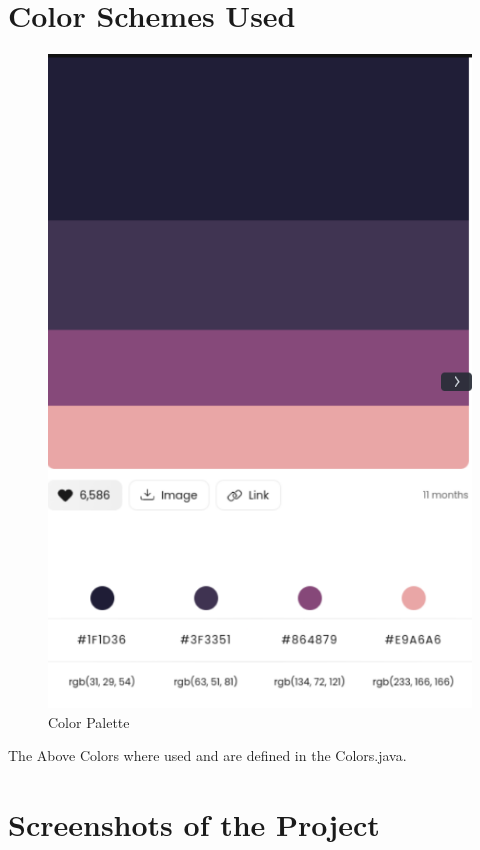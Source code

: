 \documentclass[11pt]{article}
\begin{document}
\section{Color Schemes Used}
\begin{figure}[H]
\centering
\includegraphics[scale=0.3]{design/Dark Mode Palette.png}
\caption{Color Palette}
\end{figure}
The Above Colors where used and are defined in the Colors.java.

\section{Screenshots of the Project}
\end{document}
